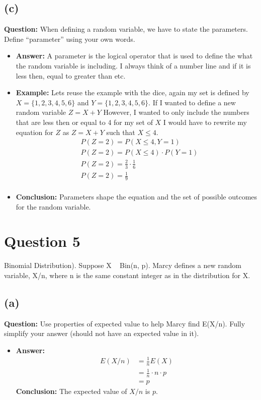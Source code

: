 \documentclass{article}
\begin{document}
\subsection*{(c)} \textbf{Question:} When defining a random variable, we have to state the parameters. Define “parameter” using your own words.
\begin{itemize}
    \item[] \textbf{Answer:} A parameter is the logical operator that is used to define the what the random variable is including. I always think of a number line and if it is less then, equal to greater than etc.
    \item[] \textbf{Example:} Lets reuse the example with the dice, again my set is defined by $X=\{1, 2, 3, 4, 5, 6\}$ and $Y=\{1, 2, 3, 4, 5, 6\}$. If I wanted to define a new random variable $Z = X + Y$ However, I 
    wanted to only include the numbers that are less then or equal to 4 for my set of $X$ I would have to rewrite my equation for $Z$ as $Z = X + Y$ such that $X \leq 4$.
    \begin{equation*}
        \begin{aligned}
        &P(Z = 2) = P(X \leq 4, Y = 1) \\
        &P(Z = 2) = P(X \leq 4) \cdot P(Y = 1) \\
        &P(Z = 2) = \frac{2}{3} \cdot \frac{1}{6} \\
        &P(Z = 2) = \frac{1}{9} \\
        \end{aligned}
    \end{equation*}
    \item[] \textbf{Conclusion:} Parameters shape the equation and the set of possible outcomes for the random variable.
    \end{itemize}
    \newpage
\section*{Question 5} Binomial Distribution). Suppose X ~ Bin(n, p). Marcy defines a new random variable,
X/n, where n is the same constant integer as in the distribution for X.
\subsection*{(a)} \textbf{Question:} Use properties of expected value to help Marcy find E(X/n). Fully simplify your
answer (should not have an expected value in it).
\begin{itemize}
    \item[] \textbf{Answer:} 
    \begin{equation*}
        \begin{aligned}
        E(X/n) &= \frac{1}{n}E(X) \\
        &= \frac{1}{n} \cdot n \cdot p \\
        &= p
        \end{aligned}
    \end{equation*}
    \textbf{Conclusion:} The expected value of $X/n$ is $p$.
\end{itemize}
\end{document}
